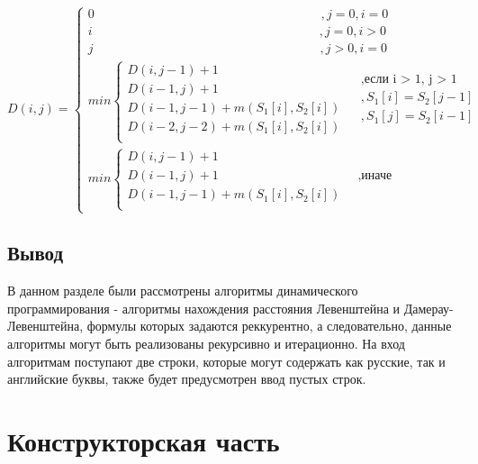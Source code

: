 \documentclass[a4paper,14pt, unknownkeysallowed]{bmstu}
\begin{document}
	\begin{equation}
    	\label{eq:DL}
    	D(i, j) = \begin{cases}
    	0  \qquad\qquad\qquad\qquad\qquad\qquad\qquad\qquad\qquad,j = 0, i = 0\\
    	i  \qquad\qquad\qquad\qquad\qquad\qquad\qquad\qquad\qquad,j = 0, i > 0\\
    	j  \qquad\qquad\qquad\qquad\qquad\qquad\qquad\qquad\qquad,j > 0, i = 0\\
    	min \begin{cases}
    		D(i, j - 1) + 1\\
    		D(i - 1, j) + 1\\
    		D(i - 1, j - 1) + m(S_{1}[i], S_{2}[i]) \\
    		D(i - 2, j - 2) + m(S_{1}[i], S_{2}[i]) \\
    	\end{cases}
    	\begin{aligned}
    		& , \text{если i > 1, j > 1} \\
    		& , S_{1}[i] = S_{2}[j - 1]  \\
    		& , S_{1}[j] =  S_{2}[i - 1] \\
    	\end{aligned}\\
    	min \begin{cases}
    		D(i, j - 1) + 1\\
    		D(i - 1, j) + 1 & \;\; \text{,иначе}\\
    		D(i - 1, j - 1) + m(S_{1}[i], S_{2}[i]) \\
    	\end{cases}
	\end{cases}
\end{equation}

\section{Вывод}

В данном разделе были рассмотрены алгоритмы динамического программирования - алгоритмы нахождения расстояния Левенштейна и Дамерау-Левенштейна, формулы которых задаются реккурентно, а следовательно, данные алгоритмы могут быть реализованы рекурсивно и итерационно. На вход алгоритмам поступают две строки, которые могут содержать как русские, так и английские буквы, также будет предусмотрен ввод пустых строк.

\chapter{Конструкторская часть}
\end{document}
